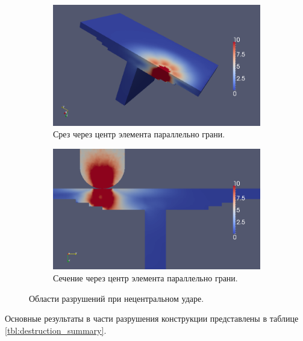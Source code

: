 \begin{figure}[h]
\begin{subfigure}[b]{\textwidth}
\center
\includegraphics[width=\textwidth]{png/pkm-experiment/wing-stringer-non-center/sum-3d.png}
\caption{Срез через центр элемента параллельно грани.}
\end{subfigure}
\begin{subfigure}[b]{\textwidth}
\center
\includegraphics[width=\textwidth]{png/pkm-experiment/wing-stringer-non-center/sum.png}
\caption{Сечение через центр элемента параллельно грани.}
\end{subfigure}
\caption{Области разрушений при нецентральном ударе.}
\label{pic:pkm_experiment_wing_stringer_non_center_result}
\end{figure}


Основные результаты в части разрушения конструкции представлены в таблице \ref{tbl:destruction_summary}.

